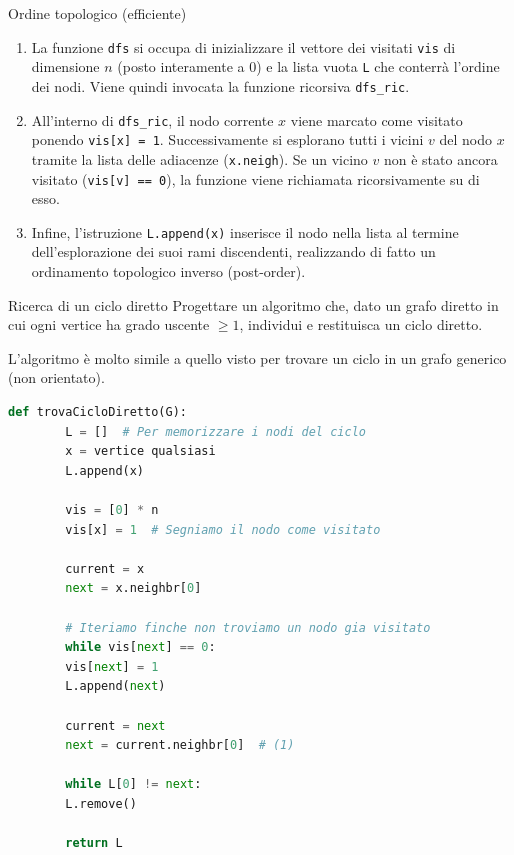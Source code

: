 \documentclass[12pt]{report}
\begin{document}
	\begin{algoritmo}{Ordine topologico (efficiente)}{}
		\begin{enumerate}
			\item La funzione \texttt{dfs} si occupa di inizializzare il vettore dei visitati \texttt{vis} di dimensione $n$ (posto interamente a $0$) e la lista vuota \texttt{L} che conterrà l'ordine dei nodi. Viene quindi invocata la funzione ricorsiva \texttt{dfs\_ric}.
			
			\item All'interno di \texttt{dfs\_ric}, il nodo corrente $x$ viene marcato come visitato ponendo \texttt{vis[x] = 1}. Successivamente si esplorano tutti i vicini $v$ del nodo $x$ tramite la lista delle adiacenze (\texttt{x.neigh}). Se un vicino $v$ non è stato ancora visitato (\texttt{vis[v] == 0}), la funzione viene richiamata ricorsivamente su di esso.
			
			\item Infine, l'istruzione \texttt{L.append(x)} inserisce il nodo nella lista al termine dell'esplorazione dei suoi rami discendenti, realizzando di fatto un ordinamento topologico inverso (post-order).
		\end{enumerate}
	\end{algoritmo}
	
	
	
	\begin{esercizio}{Ricerca di un ciclo diretto}{}
		Progettare un algoritmo che, dato un grafo diretto in cui ogni vertice ha grado uscente $\ge 1$, individui e restituisca un ciclo diretto.
	\end{esercizio}
	
	L'algoritmo è molto simile a quello visto per trovare un ciclo in un grafo generico (non orientato).
	
	\begin{lstlisting}[style=stile-listings, language=Python, caption={Algoritmo per la ricerca di un ciclo diretto}]
		def trovaCicloDiretto(G):
		L = []  # Per memorizzare i nodi del ciclo
		x = vertice qualsiasi
		L.append(x)
		
		vis = [0] * n
		vis[x] = 1  # Segniamo il nodo come visitato
		
		current = x
		next = x.neighbr[0]
		
		# Iteriamo finche non troviamo un nodo gia visitato
		while vis[next] == 0:
		vis[next] = 1
		L.append(next)
		
		current = next
		next = current.neighbr[0]  # (1)
		
		while L[0] != next:
		L.remove()
		
		return L
	\end{lstlisting}
	
\end{document}
